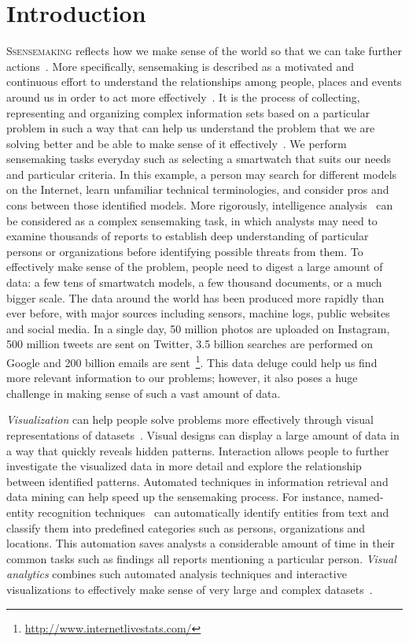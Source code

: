 \chapter{Introduction}
\label{chap:intro}

\graphicspath{{Chapter1/figures/}}

\lettrine{S}{sensemaking} reflects how we make sense of the world so that we can take further actions~\cite{Snowden2005}. More specifically, sensemaking is described as a motivated and continuous effort to understand the relationships among people, places and events around us in order to act more effectively~\cite{Klein2006a}. It is the process of collecting, representing and organizing complex information sets based on a particular problem in such a way that can help us understand the problem that we are solving better and be able to make sense of it effectively~\cite{Russell2008}. We perform sensemaking tasks everyday such as selecting a smartwatch that suits our needs and particular criteria. In this example, a person may search for different models on the Internet, learn unfamiliar technical terminologies, and consider pros and cons between those identified models. More rigorously, intelligence analysis~\cite{Heuer1999} can be considered as a complex sensemaking task, in which analysts may need to examine thousands of reports to establish deep understanding of particular persons or organizations before identifying possible threats from them. To effectively make sense of the problem, people need to digest a large amount of data: a few tens of smartwatch models, a few thousand documents, or a much bigger scale. The data around the world has been produced more rapidly than ever before, with major sources including sensors, machine logs, public websites and social media. In a single day, 50 million photos are uploaded on Instagram, 500 million tweets are sent on Twitter, 3.5 billion searches are performed on Google and 200 billion emails are sent~\footnote{\url{http://www.internetlivestats.com/}}. This data deluge could help us find more relevant information to our problems; however, it also poses a huge challenge in making sense of such a vast amount of data.

\emph{Visualization} can help people solve problems more effectively through visual representations of datasets~\cite{Munzner2014}. Visual designs can display a large amount of data in a way that quickly reveals hidden patterns. Interaction allows people to further investigate the visualized data in more detail and explore the relationship between identified patterns. Automated techniques in information retrieval and data mining can help speed up the sensemaking process. For instance, named-entity recognition techniques~\cite{Nadeau2007} can automatically identify entities from text and classify them into predefined categories such as persons, organizations and locations. This automation saves analysts a considerable amount of time in their common tasks such as findings all reports mentioning a particular person. \emph{Visual analytics} combines such automated analysis techniques and interactive visualizations to effectively make sense of very large and complex datasets~\cite{Keim2010}.

